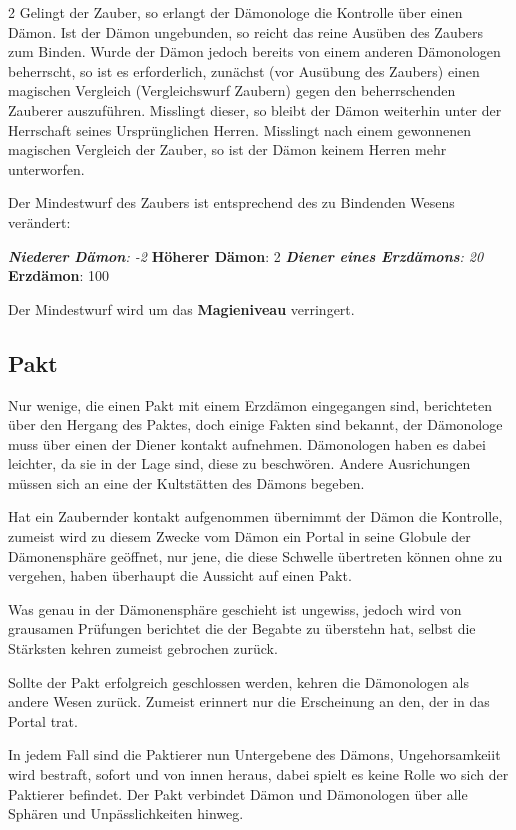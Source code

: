 \begin{multicols*}{2}
Gelingt der Zauber, so erlangt der Dämonologe die Kontrolle über einen Dämon. Ist der Dämon ungebunden, so reicht das reine Ausüben des Zaubers zum Binden. Wurde der Dämon jedoch bereits von einem anderen Dämonologen beherrscht, so ist es erforderlich, zunächst (vor Ausübung des Zaubers) einen magischen Vergleich (Vergleichswurf Zaubern) gegen den beherrschenden Zauberer auszuführen. Misslingt dieser, so bleibt der Dämon weiterhin unter der Herrschaft seines Ursprünglichen Herren. Misslingt nach einem gewonnenen magischen Vergleich der Zauber, so ist der Dämon keinem Herren mehr unterworfen.

Der Mindestwurf des Zaubers ist entsprechend des zu Bindenden Wesens verändert:

\textit{ \textbf{Niederer Dämon}: -2 } \textbf{Höherer Dämon}: 2 \textit{ \textbf{Diener eines Erzdämons}: 20 } \textbf{Erzdämon}: 100

Der Mindestwurf wird um das \textbf{Magieniveau} verringert.



\subsection{Pakt}

Nur wenige, die einen Pakt mit einem Erzdämon eingegangen sind, berichteten über den Hergang des Paktes, doch einige Fakten sind bekannt, der Dämonologe muss über einen der Diener kontakt aufnehmen. Dämonologen haben es dabei leichter, da sie in der Lage sind, diese zu beschwören. Andere Ausrichungen müssen sich an eine der Kultstätten des Dämons begeben.

Hat ein Zaubernder kontakt aufgenommen übernimmt der Dämon die Kontrolle, zumeist wird zu diesem Zwecke vom Dämon ein Portal in seine Globule der Dämonensphäre geöffnet, nur jene, die diese Schwelle übertreten können ohne zu vergehen, haben überhaupt die Aussicht auf einen Pakt.

Was genau in der Dämonensphäre geschieht ist ungewiss, jedoch wird von grausamen Prüfungen berichtet die der Begabte zu überstehn hat, selbst die Stärksten kehren zumeist gebrochen zurück.

Sollte der Pakt erfolgreich geschlossen werden, kehren die Dämonologen als andere Wesen zurück. Zumeist erinnert nur die Erscheinung an den, der in das Portal trat.

In jedem Fall sind die Paktierer nun Untergebene des Dämons, Ungehorsamkeiit wird bestraft, sofort und von innen heraus, dabei spielt es keine Rolle wo sich der Paktierer befindet. Der Pakt verbindet Dämon und Dämonologen über alle Sphären und Unpässlichkeiten hinweg.


\end{multicols*}
